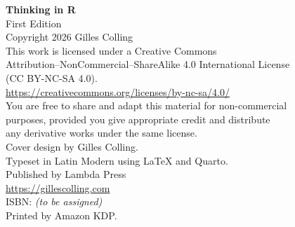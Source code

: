 \thispagestyle{empty}
\null\vfill
\noindent
{\small
\textbf{Thinking in R}\\
First Edition\\[1em]

Copyright \textcopyright{} 2026 Gilles Colling\\[1em]

This work is licensed under a Creative Commons\\
Attribution--NonCommercial--ShareAlike 4.0 International License\\
(CC BY-NC-SA 4.0).\\[0.5em]
\url{https://creativecommons.org/licenses/by-nc-sa/4.0/}\\[1em]

You are free to share and adapt this material for non-commercial\\
purposes, provided you give appropriate credit and distribute\\
any derivative works under the same license.\\[1em]

Cover design by Gilles Colling.\\
Typeset in Latin Modern using \LaTeX{} and Quarto.\\[1em]

Published by Lambda Press\\
\url{https://gillescolling.com}\\[1em]

ISBN: \emph{(to be assigned)}\\[1em]

Printed by Amazon KDP.
}
\vspace*{2cm}
\clearpage
